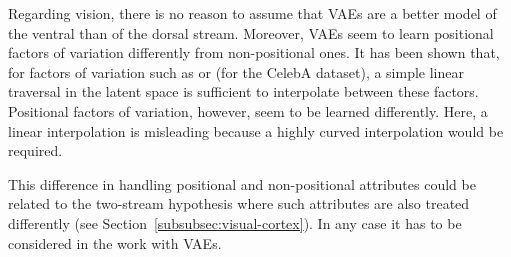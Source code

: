 Regarding vision, there is no reason to assume that \acp{VAE} are a better model of the ventral than of the dorsal stream.
Moreover, \acp{VAE} seem to learn positional factors of variation differently from non-positional ones.
It has been shown that, for factors of variation such as  or  (for the CelebA dataset), a simple linear traversal in the latent space is sufficient to interpolate between these factors.
Positional factors of variation, however, seem to be learned differently.
Here, a linear interpolation is misleading because a highly curved interpolation would be required.

This difference in handling positional and non-positional attributes could be related to the two-stream hypothesis where such attributes are also treated differently (see Section~\ref{subsubsec:visual-cortex}).
In any case it has to be considered in the work with \acp{VAE}.

